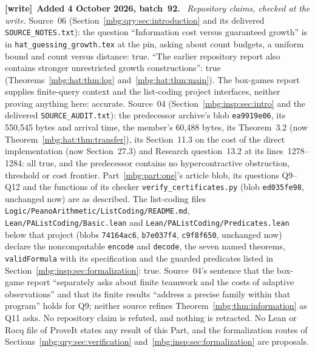 \documentclass[11pt,letterpaper]{article}
\theoremstyle{definition}
\newenvironment{writenote}[1][]{\par\smallskip\begingroup\small
 \noindent\textbf{[write]}\if\relax\detokenize{#1}\relax\else~\textbf{#1.}\fi\ }%
 {\par\endgroup\smallskip}
\begin{document}
\begin{writenote}[Added 4 October 2026, batch~92]
\emph{Repository claims, checked at the write.} Source~06 (Section~\ref{mbg:qry:sec:introduction} and its delivered \texttt{SOURCE\_\allowbreak NOTES.txt}): the question ``Information cost versus guaranteed growth'' is in \texttt{hat\_\allowbreak guessing\_\allowbreak growth.tex} at the pin, asking about count budgets, a uniform bound and count versus distance: true. ``The earlier repository report also contains stronger unrestricted growth constructions'': true (Theorems~\ref{mbg:hat:thm:log} and~\ref{mbg:hat:thm:main}). The box-games report supplies finite-query context and the list-coding project interfaces, neither proving anything here: accurate. Source~04 (Section~\ref{mbg:insp:sec:intro} and the delivered \texttt{SOURCE\_\allowbreak AUDIT.txt}): the predecessor archive's blob \texttt{ea9919e06}, its 550,545 bytes and arrival time, the member's 60,488 bytes, its Theorem~3.2 (now Theorem~\ref{mbg:hat:thm:transfer}), its Section~11.3 on the cost of the direct implementation (now Section~27.3) and Research question~13.2 at its lines~1278--1284: all true, and the predecessor contains no hypercontractive obstruction, threshold or cost frontier. Part~\ref{mbg:part:one}'s article blob, its questions Q9--Q12 and the functions of its checker \texttt{verify\_\allowbreak certificates.py} (blob \texttt{ed035fe98}, unchanged now) are as described. The list-coding files \nolinkurl{Logic/PeanoArithmetic/ListCoding/README.md}, \nolinkurl{Lean/PAListCoding/Basic.lean} and \nolinkurl{Lean/PAListCoding/Predicates.lean} below that project (blobs \texttt{74164ac6}, \texttt{b7e037f4}, \texttt{c9f8f650}, unchanged now) declare the noncomputable \texttt{encode} and \texttt{decode}, the seven named theorems, \texttt{validFormula} with its specification and the guarded predicates listed in Section~\ref{mbg:insp:sec:formalization}: true. Source~04's sentence that the box-game report ``separately asks about finite teamwork and the costs of adaptive observations'' and that its finite results ``address a precise family within that program'' holds for Q9; neither source refines Theorem~\ref{mbg:thm:information} as Q11 asks. No repository claim is refuted, and nothing is retracted. No Lean or Rocq file of ProveIt states any result of this Part, and the formalization routes of Sections~\ref{mbg:qry:sec:verification} and~\ref{mbg:insp:sec:formalization} are proposals.


\end{writenote}
\end{document}

